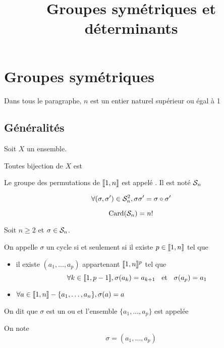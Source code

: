 

\title{Groupes symétriques et déterminants}



\maketitle
\pagebreak
\tableofcontents

\section{Groupes symétriques}

Dans tous le paragraphe, $n$ est un entier naturel supérieur ou égal à 1

\subsection{Généralités}

\begin{dfn}
  Soit $X$ un ensemble.

  Toutes bijection de $X$ est 
\end{dfn}

\begin{dfn}
  Le groupe des permutations de $\llbracket 1, n \rrbracket$ est appelé
  .
  Il est noté $\mathcal{S}_n$ 
\end{dfn}

\begin{dfn}
  \[
    \forall (\sigma, \sigma') \in \mathcal{S}_n^2, \sigma \sigma' = \sigma \circ \sigma'
  \]
\end{dfn}

\begin{prp}
  \[
    \operatorname{\mathrm{Card}}(\mathcal{S}_n) = n!
  \]
\end{prp}

\begin{dfn}
  Soit $n \geq 2$ et $\sigma \in \mathcal{S}_n$.

  On appelle $\sigma$ un cycle si et seulement si il existe
  $p \in \llbracket 1, n \rrbracket$ tel que
  \begin{itemize}
    \item il existe $(a_1, \ldots, a_p)$ appartenant $\llbracket 1, n \rrbracket^p$ tel que
      \[
        \forall k \in \llbracket 1, p - 1 \rrbracket, \sigma(a_k) = a_{k + 1} \;\;\text{ et }\;\; \sigma(a_p) = a_1
      \]
    \item $\forall a \in \llbracket 1, n \rrbracket - \{ a_1, \ldots, a_n \}, \sigma(a) = a$
  \end{itemize}
  
  On dit que $\sigma$ est un  ou  et
  l'ensemble $\{a_1, \ldots, a_p \}$ est appelée 

  On note
  \[
    \sigma = (a_1, \ldots, a_p)
  \]
\end{dfn}

